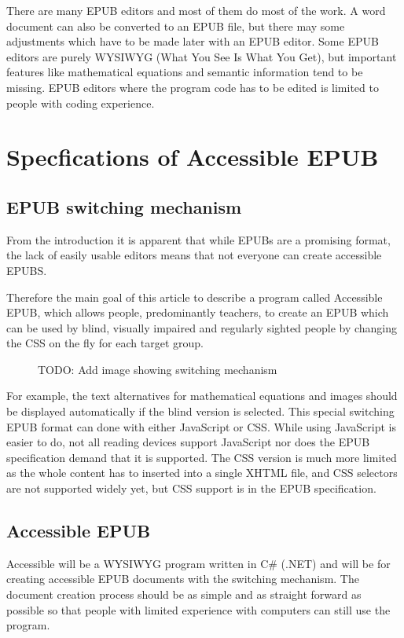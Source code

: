 \documentclass{article}
\begin{document}
There are many EPUB editors and most of them do most of the work. A word document can also be converted to an EPUB file, but there may some adjustments which have to be made later with an EPUB editor. 
Some EPUB editors are purely WYSIWYG (What You See Is What You Get), but important features like mathematical equations and semantic information tend to be missing. EPUB editors where the program code has to be edited is limited to people with coding experience.


\section{Specfications of Accessible EPUB}

\subsection{EPUB switching mechanism}

From the introduction it is apparent that while EPUBs are a promising format, the lack of easily usable editors means that not everyone can create accessible EPUBS.

Therefore the main goal of this article to describe a program called Accessible EPUB, which allows people, predominantly teachers, to create an EPUB which can be used by blind, visually impaired and regularly sighted people by changing the CSS on the fly for each target group. 


\begin{figure}
	\caption{TODO: Add image showing switching mechanism}
\end{figure}


For example, the text alternatives for mathematical equations and images should be displayed automatically if the blind version is selected. This special switching EPUB format can done with either JavaScript or CSS. While using JavaScript is easier to do, not all reading devices support JavaScript nor does the EPUB specification demand that it is supported. The CSS version is much more limited as the whole content has to inserted into a single XHTML file, and CSS selectors are not supported widely yet, but CSS support is in the EPUB specification.

\subsection{Accessible EPUB}
Accessible will be a WYSIWYG program written in C\# (.NET) and will be for creating accessible EPUB documents with the switching mechanism. The document creation process should be as simple and as straight forward as possible so that people with limited experience with computers can still use the program.
\end{document}
